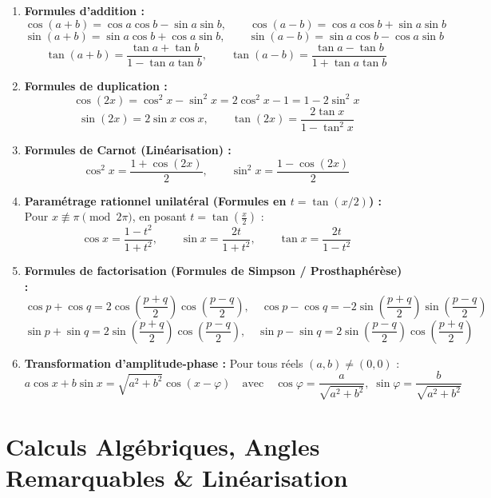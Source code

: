 \documentclass[11pt,a4paper]{article}
\begin{document}
\begin{coursbox}
\begin{enumerate}
    \item \textbf{Formules d'addition :}
    \[
    \cos(a + b) = \cos a \cos b - \sin a \sin b, \qquad \cos(a - b) = \cos a \cos b + \sin a \sin b
    \]
    \[
    \sin(a + b) = \sin a \cos b + \cos a \sin b, \qquad \sin(a - b) = \sin a \cos b - \cos a \sin b
    \]
    \[
    \tan(a + b) = \frac{\tan a + \tan b}{1 - \tan a \tan b}, \qquad \tan(a - b) = \frac{\tan a - \tan b}{1 + \tan a \tan b}
    \]
    \item \textbf{Formules de duplication :}
    \[
    \cos(2x) = \cos^2 x - \sin^2 x = 2\cos^2 x - 1 = 1 - 2\sin^2 x
    \]
    \[
    \sin(2x) = 2\sin x \cos x, \qquad \tan(2x) = \frac{2\tan x}{1 - \tan^2 x}
    \]
    \item \textbf{Formules de Carnot (Linéarisation) :}
    \[
    \cos^2 x = \frac{1 + \cos(2x)}{2}, \qquad \sin^2 x = \frac{1 - \cos(2x)}{2}
    \]
    \item \textbf{Paramétrage rationnel unilatéral (Formules en $t = \tan(x/2)$) :}
    Pour $x \not\equiv \pi \pmod{2\pi}$, en posant $t = \tan\left(\frac{x}{2}\right)$ :
    \[
    \cos x = \frac{1 - t^2}{1 + t^2}, \qquad \sin x = \frac{2t}{1 + t^2}, \qquad \tan x = \frac{2t}{1 - t^2}
    \]
    \item \textbf{Formules de factorisation (Formules de Simpson / Prosthaphérèse) :}
    \[
    \cos p + \cos q = 2 \cos\left(\frac{p+q}{2}\right) \cos\left(\frac{p-q}{2}\right), \quad \cos p - \cos q = -2 \sin\left(\frac{p+q}{2}\right) \sin\left(\frac{p-q}{2}\right)
    \]
    \[
    \sin p + \sin q = 2 \sin\left(\frac{p+q}{2}\right) \cos\left(\frac{p-q}{2}\right), \quad \sin p - \sin q = 2 \sin\left(\frac{p-q}{2}\right) \cos\left(\frac{p+q}{2}\right)
    \]
    \item \textbf{Transformation d'amplitude-phase :} Pour tous réels $(a, b) \neq (0, 0)$ :
    \[
    a \cos x + b \sin x = \sqrt{a^2 + b^2} \cos(x - \varphi) \quad \text{avec} \quad \cos\varphi = \frac{a}{\sqrt{a^2+b^2}}, \; \sin\varphi = \frac{b}{\sqrt{a^2+b^2}}
    \]
\end{enumerate}
\end{coursbox}

\vspace{0.4cm}

\section{Calculs Algébriques, Angles Remarquables \& Linéarisation}
\end{document}
